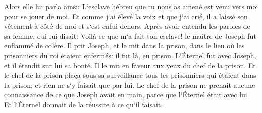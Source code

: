 \verse Alors elle lui parla ainsi: L`esclave hébreu que tu nous as amené est venu vers moi pour se jouer de moi. 
\verse Et comme j`ai élevé la voix et que j`ai crié, il a laissé son vêtement à côté de moi et s`est enfui dehors. 
\verse Après avoir entendu les paroles de sa femme, qui lui disait: Voilà ce que m`a fait ton esclave! le maître de Joseph fut enflammé de colère. 
\verse Il prit Joseph, et le mit dans la prison, dans le lieu où les prisonniers du roi étaient enfermés: il fut là, en prison. 
\verse L`Éternel fut avec Joseph, et il étendit sur lui sa bonté. Il le mit en faveur aux yeux du chef de la prison. 
\verse Et le chef de la prison plaça sous sa surveillance tous les prisonniers qui étaient dans la prison; et rien ne s`y faisait que par lui. 
\verse Le chef de la prison ne prenait aucune connaissance de ce que Joseph avait en main, parce que l`Éternel était avec lui. Et l`Éternel donnait de la réussite à ce qu`il faisait. 

\chapter{}

